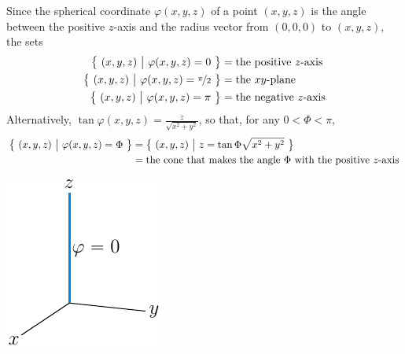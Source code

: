 \begin{solution}
Since the spherical coordinate $\varphi(x,y,z)$ of a point $(x,y,z)$ is
the angle between the positive $z$-axis and the radius vector from 
$(0,0,0)$ to $(x,y,z)$, the sets
\begin{align*}
\big\{ \ (x,y,z)\ \big|\ \varphi(x,y,z)=0\ \big\}
&=\text{the positive $z$-axis} \\
\big\{ \ (x,y,z)\ \big|\ \varphi(x,y,z)=\nicefrac{\pi}{2}\ \big\}
&=\text{the $xy$-plane} \\
\big\{ \ (x,y,z)\ \big|\ \varphi(x,y,z)=\pi\ \big\}
&=\text{the negative $z$-axis} 
\end{align*} 
Alternatively, $\tan\varphi(x,y,z)=\frac{z}{\sqrt{x^2+y^2}}$, so that,
for any $0<\Phi<\pi$,
\begin{align*}
\big\{ \ (x,y,z)\ \big|\ \varphi(x,y,z)=\Phi\ \big\}
&=\big\{ \ (x,y,z)\ \big|\ z=\tan\Phi\sqrt{x^2+y^2}\ \big\} \\
&=\text{the cone that makes the angle $\Phi$ with the positive $z$-axis} 
\end{align*} 
\begin{center}
   \includegraphics{fig/spherPhi0.pdf}\qquad\quad
      \qquad\quad

\end{center}
\end{solution}
